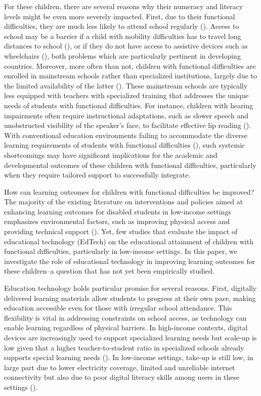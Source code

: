 \documentclass[hidelinks,12pt]{article}
\begin{document}
\begin{singlespace}
For these children, there are several reasons why their numeracy and literacy levels might be even more severely impacted. First, due to their functional difficulties, they are much less likely to attend school regularly (\cite{zhang_numeracy_2023}). Access to school may be a barrier if a child with mobility difficulties has to travel long distances to school (\cite{trani_delivering_2012}), or if they do not have access to assistive devices such as wheelchairs (\cite{lamichhane_disability_2013}), both problems which are particularly pertinent in developing countries. Moreover, more often than not, children with functional difficulties are enrolled in mainstream schools rather than specialized institutions, largely due to the limited availability of the latter (\cite{mckinney_life_2016}). These mainstream schools are typically less equipped with teachers with specialized training that addresses the unique needs of students with functional difficulties. For instance, children with hearing impairments often require instructional adaptations, such as slower speech and unobstructed visibility of the speaker’s face, to facilitate effective lip reading (\cite{lockwood_hearing_2006}). With conventional education environments failing to accommodate the diverse learning requirements of students with functional difficulties (\cite{yuwono_classroom_2021}), such systemic shortcomings may have significant implications for the academic and developmental outcomes of these children with functional difficulties, particularly when they require tailored support to successfully integrate. 

How can learning outcomes for children with functional difficulties be improved? The majority of the existing literature on interventions and policies aimed at enhancing learning outcomes for disabled students in low-income settings emphasizes environmental factors, such as improving physical access and providing technical support (\cite{hanafin_including_2007}). Yet, few studies that evaluate the impact of educational technology (EdTech) on the educational attainment of children with functional difficulties, particularly in low-income settings. In this paper, we investigate the role of educational technology in improving learning outcomes for these children–a question that has not yet been empirically studied. 

Education technology holds particular promise for several reasons. First, digitally delivered learning materials allow students to progress at their own pace, making education accessible even for those with irregular school attendance. This flexibility is vital in addressing constraints on school access, as technology can enable learning regardless of physical barriers. In high-income contexts, digital devices are increasingly used to support specialized learning needs but scale-up is low given that a higher teacher-to-student ratio in specialized schools already supports special learning needs (\cite{bastawrous_mobile_2013}). In low-income settings, take-up is still low, in large part due to lower electricity coverage, limited and unreliable internet connectivity but also due to poor digital literacy skills among users in these settings (\cite{rodriguez-segura_edtech_2022}).


\end{singlespace}
\end{document}
